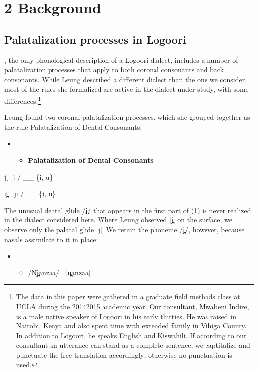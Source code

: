 \chapter{2 Background}
\section{Palatalization processes in Logoori} %

\citet{Leung1991}, the only phonological description of a Logoori dialect, includes a number of palatalization processes that apply to both coronal consonants and back consonants. While Leung described a different dialect than the one we consider, most of the rules she formalized are active in the dialect under study, with some differences.\footnote{   The data in this paper were gathered in a graduate field methods class at UCLA during the 20142015 academic year. Our consultant, Mwabeni Indire, is a male native speaker of Logoori in his early thirties. He was raised in Nairobi, Kenya and also spent time with extended family in Vihiga County. In addition to Logoori, he speaks English and Kiswahili. If according to our consultant an utterance can stand as a complete sentence, we captitalize and punctuate the free translation accordingly; otherwise no punctuation is used.} 

Leung found two coronal palatalization processes, which she grouped together as the rule Palatalization of Dental Consonants:

\setcounter{itemize}{0}
\begin{itemize}
\item \setcounter{itemize}{0}
\begin{itemize}
\item \textbf{Palatalization of Dental Consonants} \citep[117]{Leung1991}

\end{itemize}
\end{itemize}

j̪  j / \_\_ \{i, u\}

n̪  ɲ / \_\_ \{i, u\}

The unusual dental glide /j̪/ that appears in the first part of (1) is never realized in the dialect considered here. Where Leung observed [j̪] on the surface, we observe only the palatal glide [j]. We retain the phoneme /j̪/, however, because nasals assimilate to it in place:

\begin{itemize}
\item \setcounter{itemize}{0}
\begin{itemize}
\item /Nj̪anzaa/    [n̪anzaa]  

\end{itemize}
\end{itemize}

